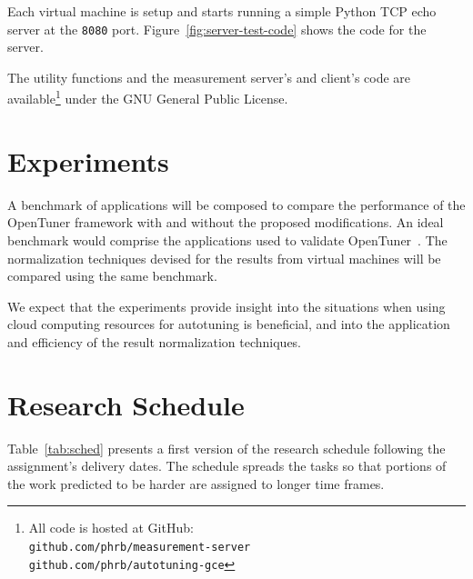 \documentclass[a4paper, 12pt]{article}
\begin{document}
Each virtual machine is setup and starts running a simple
Python TCP echo server at the \texttt{\footnotesize 8080}
port. Figure~\ref{fig:server-test-code} shows the code for the
server.

The utility functions and the measurement server's and client's code
are available\footnote{All code is hosted at GitHub: \\
\texttt{\scriptsize github.com/phrb/measurement-server} \\
\texttt{\scriptsize github.com/phrb/autotuning-gce}}
under the GNU General Public License.



\section{Experiments} \label{sec:exp}

A benchmark of applications will be composed to compare the performance of
the OpenTuner framework with and without the proposed modifications.
An ideal benchmark would comprise the applications used to validate
OpenTuner~\cite{ansel2014opentuner}.
The normalization techniques devised for the results from virtual machines
will be compared using the same benchmark.

We expect that the experiments provide insight into the situations
when using cloud computing resources for autotuning is beneficial,
and into the application and efficiency of the result normalization
techniques.

\section{Research Schedule} \label{sec:sched}

Table~\ref{tab:sched} presents a first version of the research schedule
following the assignment's delivery dates.
The schedule spreads the tasks so that portions of the work
predicted to be harder are assigned to longer time frames.

\newcommand{\specialcell}[2][c]{%
  \begin{tabular}[#1]{@{}K@{}}#2\end{tabular}}
\end{document}
